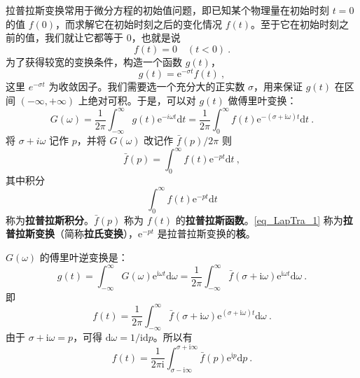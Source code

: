 
拉普拉斯变换常用于微分方程的初始值问题，即已知某个物理量在初始时刻 $t=0$ 的值 $f(0)$，而求解它在初始时刻之后的变化情况 $f(t)$。至于它在初始时刻之前的值，我们就让它都等于 $0$，也就是说
\begin{equation}
f(t)=0 \quad(t<0)~.
\end{equation}
为了获得较宽的变换条件，构造一个函数 $g(t)$，
\begin{equation}
g(t)=\mathrm{e}^{-\sigma t} f(t)~,
\end{equation}
这里 $e^{-\sigma t}$ 为收敛因子。我们需要选一个充分大的正实数 $\sigma$，用来保证 $g(t) $ 在区间 $(-\infty,+\infty)$ 上绝对可积。于是，可以对 $g(t) $ 做傅里叶变换：
\begin{equation}
G(\omega)=\frac{1}{2 \pi} \int_{-\infty}^{\infty} g(t) \mathrm{e}^{-i\omega t} \mathrm{d} t=\frac{1}{2 \pi} \int_{0}^{\infty} f(t) \mathrm{e}^{-(\sigma+\mathrm{i} \omega) t} \mathrm{d} t~.
\end{equation}
将 $\sigma+i \omega$ 记作 $p$，并将 $G(\omega)$ 改记作 $\bar f(p) / 2 \pi$ 则
\begin{equation} \label{eq_LapTra_1}
\bar{f}(p)=\int_{0}^{\infty} f(t) \mathrm{e}^{-p t} \mathrm{d} t~,
\end{equation}
其中积分
\begin{equation}
\int_{0}^{\infty} f(t) \mathrm{e}^{-p t} \mathrm{d} t
\end{equation}
称为\textbf{拉普拉斯积分}。$\bar f(p)$ 称为 $f(t)$ 的\textbf{拉普拉斯函数}。\autoref{eq_LapTra_1} 称为\textbf{拉普拉斯变换}（简称\textbf{拉氏变换}），$\mathrm e^{-pt}$ 是拉普拉斯变换的\textbf{核}。

$G(\omega)$ 的傅里叶逆变换是：
\begin{equation}
g(t)=\int_{-\infty}^{\infty} G(\omega) \mathrm{e}^{\mathrm{i} \omega t} \mathrm{d} \omega=\frac{1}{2 \pi} \int_{-\infty}^{\infty} \bar{f}(\sigma+\mathrm{i} \omega) \mathrm{e}^{\mathrm{i} \omega t} \mathrm{d} \omega~.
\end{equation}
即
\begin{equation}
f(t)=\frac{1}{2 \pi} \int_{-\infty}^{\infty} \bar{f}(\sigma+\mathrm{i} \omega) \mathrm{e}^{(\sigma+\mathrm{i} \omega)t} \mathrm{d} \omega~.
\end{equation}
由于 $\sigma+\mathrm i\omega=p$，可得 $\mathrm d\omega = 1/\mathrm i\mathrm dp$。所以有
\begin{equation}
f(t)=\frac{1}{2 \pi \mathrm{i}} \int_{\sigma-\mathrm{i} \infty}^{\sigma+\mathrm{i} \infty} \bar{f}(p) \mathrm{e}^{\mathrm{i} p} \mathrm{d} p~.
\end{equation}

